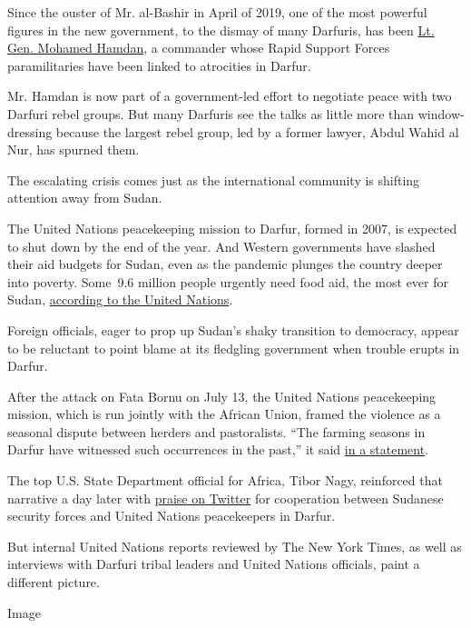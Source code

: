 Since the ouster of Mr. al-Bashir in April of 2019, one of the most
powerful figures in the new government, to the dismay of many Darfuris,
has been
\href{https://www.nytimes3xbfgragh.onion/2019/06/15/world/africa/sudan-leader-hemeti.html}{Lt.
Gen. Mohamed Hamdan}, a commander whose Rapid Support Forces
paramilitaries have been linked to atrocities in Darfur.

Mr. Hamdan is now part of a government-led effort to negotiate peace
with two Darfuri rebel groups. But many Darfuris see the talks as little
more than window-dressing because the largest rebel group, led by a
former lawyer, Abdul Wahid al Nur, has spurned them.

The escalating crisis comes just as the international community is
shifting attention away from Sudan.

The United Nations peacekeeping mission to Darfur, formed in 2007, is
expected to shut down by the end of the year. And Western governments
have slashed their aid budgets for Sudan, even as the pandemic plunges
the country deeper into poverty. Some~9.6 million people urgently need
food aid, the most ever for Sudan,
\href{http://www.ipcinfo.org/ipcinfo-website/ipc-alerts/issue-23/en/}{according
to the United Nations}.

Foreign officials, eager to prop up Sudan's shaky transition to
democracy, appear to be reluctant to point blame at its fledgling
government when trouble erupts in Darfur.

After the attack on Fata Bornu on July 13, the United Nations
peacekeeping mission, which is run jointly with the African Union,
framed the violence as a seasonal dispute between herders and
pastoralists. ``The farming seasons in Darfur have witnessed such
occurrences in the past,'' it said
\href{https://unamid.unmissions.org/unamid-deeply-concerned-about-violent-incidents-kutum-town-and-fata-borno-idps-camp-north-darfur}{in
a statement}.

The top U.S. State Department official for Africa, Tibor Nagy,
reinforced that narrative a day later with
\href{https://twitter.com/AsstSecStateAF/status/1283877883094749189}{praise
on Twitter} for cooperation between Sudanese security forces and United
Nations peacekeepers in Darfur.

But internal United Nations reports reviewed by The New York Times, as
well as interviews with Darfuri tribal leaders and United Nations
officials, paint a different picture.

Image

